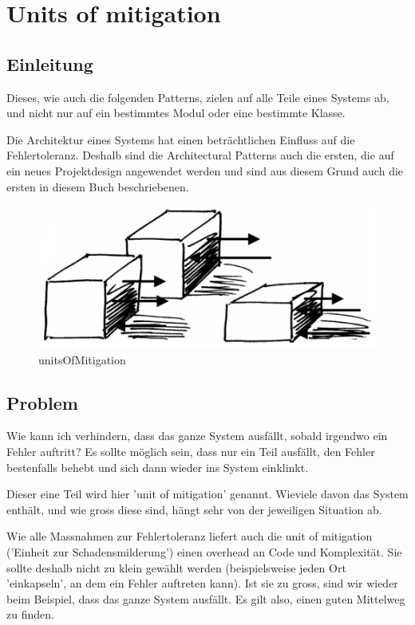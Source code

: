 \section{Units of mitigation}


\subsection{Einleitung}

Dieses, wie auch die folgenden Patterns, zielen auf alle Teile eines Systems ab, und nicht nur auf ein bestimmtes Modul oder eine bestimmte Klasse.

Die Architektur eines Systems hat einen beträchtlichen Einfluss auf die Fehlertoleranz. Deshalb sind die Architectural Patterns auch die ersten, die auf ein neues Projektdesign angewendet werden und sind aus diesem Grund auch die ersten in diesem Buch beschriebenen.

\begin{figure}[H]
	\centering
	\includegraphics[width=\textwidth]{content/faulttolerance/images/unitsOfMitigation.png}
	\caption{unitsOfMitigation}
\end{figure}


\subsection{Problem}

Wie kann ich verhindern, dass das ganze System ausfällt, sobald irgendwo ein Fehler auftritt? Es sollte möglich sein, dass nur ein Teil ausfällt, den Fehler bestenfalls behebt und sich dann wieder ins System einklinkt.

Dieser eine Teil wird hier 'unit of mitigation' genannt. Wieviele davon das System enthält, und wie gross diese sind, hängt sehr von der jeweiligen Situation ab.

Wie alle Massnahmen zur Fehlertoleranz liefert auch die unit of mitigation ('Einheit zur Schadensmilderung') einen overhead an Code und Komplexität. Sie sollte deshalb nicht zu klein gewählt werden (beispielsweise jeden Ort 'einkapseln', an dem ein Fehler auftreten kann).
Ist sie zu gross, sind wir wieder beim Beispiel, dass das ganze System ausfällt. Es gilt also, einen guten Mittelweg zu finden.

